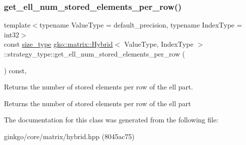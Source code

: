 \subsubsection{\texorpdfstring{get\+\_\+ell\+\_\+num\+\_\+stored\+\_\+elements\+\_\+per\+\_\+row()}{get\_ell\_num\_stored\_elements\_per\_row()}}
{\footnotesize\ttfamily template$<$typename Value\+Type = default\+\_\+precision, typename Index\+Type = int32$>$ \\
const \hyperlink{namespacegko_a6e5c95df0ae4e47aab2f604a22d98ee7}{size\+\_\+type} \hyperlink{classgko_1_1matrix_1_1Hybrid}{gko\+::matrix\+::\+Hybrid}$<$ Value\+Type, Index\+Type $>$\+::strategy\+\_\+type\+::get\+\_\+ell\+\_\+num\+\_\+stored\+\_\+elements\+\_\+per\+\_\+row (\begin{DoxyParamCaption}{ }\end{DoxyParamCaption}) const\hspace{0.3cm}{\ttfamily [inline]}, {\ttfamily [noexcept]}}



Returns the number of stored elements per row of the ell part. 

\begin{DoxyReturn}{Returns}
the number of stored elements per row of the ell part 
\end{DoxyReturn}


The documentation for this class was generated from the following file\+:\begin{DoxyCompactItemize}
\item 
ginkgo/core/matrix/hybrid.\+hpp (8045ac75)\end{DoxyCompactItemize}
